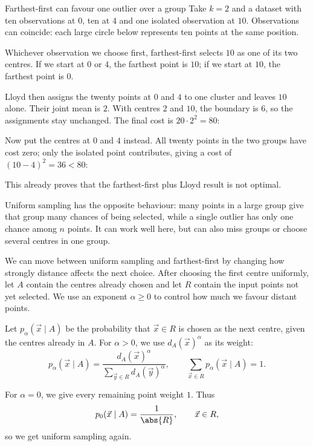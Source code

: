 \documentclass[a4paper,12pt,oneside]{report}
\begin{document}
\begin{framedexample}{Farthest-first can favour one outlier over a group}
\label{ex:farthest-outlier}
Take $k=2$ and a dataset with ten observations at $0$, ten at $4$
and one isolated observation at $10$. Observations can coincide:
each large circle below represents ten points at the same position.

Whichever observation we choose first, farthest-first selects $10$
as one of its two centres. If we start at $0$ or $4$, the farthest
point is $10$; if we start at $10$, the farthest point is $0$.

Lloyd then assigns the twenty points at $0$ and $4$ to one cluster
and leaves $10$ alone. Their joint mean is $2$. With centres $2$
and $10$, the boundary is $6$, so the assignments stay unchanged.
The final cost is $20\cdot2^2=80$:

Now put the centres at $0$ and $4$ instead. All twenty points in
the two groups have cost zero; only the isolated point contributes,
giving a cost of $(10-4)^2=36<80$:

This already proves that the farthest-first plus Lloyd result is
not optimal.
\end{framedexample}
\endgroup

Uniform sampling has the opposite behaviour: many points in a
large group give that group many chances of being selected, while
a single outlier has only one chance among $n$ points. It can work
well here, but can also miss groups or choose several centres in
one group.

We can move between uniform sampling and farthest-first by changing
how strongly distance affects the next choice. After choosing the
first centre uniformly, let $A$ contain the centres already chosen
and let $R$ contain the input points not yet selected. We use an
exponent $\alpha\geq0$ to control how much we favour distant points.

Let $p_\alpha(\vec x\mid A)$ be the probability that
$\vec x\in R$ is chosen as the next centre, given the centres
already in $A$. For $\alpha>0$, we use $d_A(\vec x)^\alpha$ as
its weight:
\[
  p_\alpha(\vec x\mid A)=
  \frac{d_A(\vec x)^\alpha}
       {\displaystyle\sum_{\vec y\in R}d_A(\vec y)^\alpha},
  \qquad \sum_{\vec x\in R}p_\alpha(\vec x\mid A)=1.
\]

For $\alpha=0$, we give every remaining point weight $1$. Thus
\[
  p_0(\vec x\mid A)=\frac{1}{\abs{R}},\qquad \vec x\in R,
\]
so we get uniform sampling again.
\end{document}
